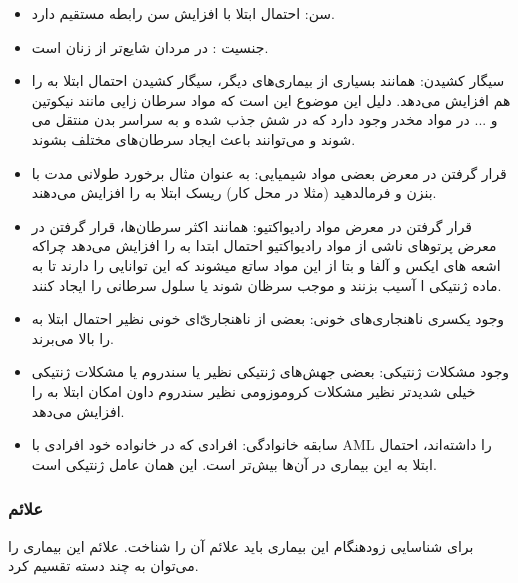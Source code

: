 \documentclass[12pt]{article}
\begin{document}
 \begin{itemize}
 	\item 
سن: احتمال ابتلا با افزایش سن رابطه مستقیم دارد.
 	
 	\item
جنسیت :  در مردان شایع‌تر از زنان است.
 	
 	
 	\item
 سیگار کشیدن: همانند بسیاری از بیماری‌های دیگر، سیگار کشیدن احتمال ابتلا به  را هم افزایش می‌دهد. دلیل این موضوع این است که مواد سرطان زایی مانند نیکوتین و ... در مواد مخدر وجود دارد که در شش جذب شده و به سراسر بدن منتقل می ‌شوند و می‌توانند باعث ایجاد سرطان‌های مختلف بشوند.
 	
 	
 	\item
 	قرار گرفتن در معرض بعضی مواد شیمیایی: به عنوان مثال برخورد طولانی مدت با بنزن و فرمالدهید  (مثلا در محل کار) ریسک ابتلا به  را افزایش می‌دهند.
 	
 	\item 
قرار گرفتن در معرض مواد رادیواکتیو: همانند اکثر سرطان‌ها، قرار گرفتن در معرض پرتو‌های ناشی از مواد رادیواکتیو احتمال ابتدا به  را افزایش می‌دهد چراکه اشعه های ایکس و آلفا و بتا از این مواد ساتع میشوند که این توانایی را دارند تا به ماده ژنتیکی ا آسیب بزنند و موجب سرظان شوند یا سلول سرطانی را ایجاد کنند.
 	
 	
 	\item
 وجود یکسری ناهنجاری‌های خونی: بعضی از ناهنجاری‌ّای خونی نظیر  احتمال ابتلا به  را بالا می‌برند. 
 	
 	
 	\item
 وجود مشکلات ژنتیکی: بعضی جهش‌های ژنتیکی نظیر  یا سندروم  یا مشکلات ژنتیکی خیلی شدیدتر نظیر مشکلات کروموزومی نظیر سندروم داون امکان ابتلا به  را افزایش می‌دهد.
 	
 	\item
 سابقه خانوادگی: افرادی که در خانواده خود افرادی با AML را داشته‌اند، احتمال ابتلا به این بیماری در آن‌ها بیش‌تر است. این همان عامل ژنتیکی است.
 	
 	

 \end{itemize}


\subsubsection{علائم }
برای شناسایی زودهنگام این بیماری باید علائم آن را شناخت. علائم این بیماری را می‌توان به چند دسته تقسیم کرد.
\end{document}
